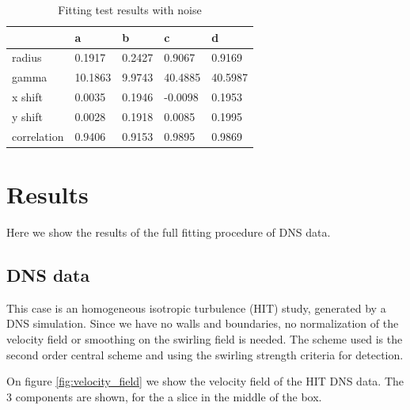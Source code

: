 \documentclass[12pt, a4paper, openany]{memoir}
\begin{document}
\begin{table}[h]
	\centering
	\caption{Fitting test results with noise}
	\vspace{10px}
	\label{tb:fittingtestnoise}
	\begin{tabular}{l|l|l|l|l}
		            & a      & b & c & d \\
		\hline
		radius      & 0.1917   & 0.2427 & 0.9067 & 0.9169  \\
		gamma       & 10.1863 & 9.9743 & 40.4885 & 40.5987 \\
		x shift     & 0.0035  & 0.1946 & -0.0098 & 0.1953 \\
		y shift     & 0.0028  & 0.1918 & 0.0085 & 0.1995 \\ 
		correlation & 0.9406   & 0.9153 & 0.9895 & 0.9869 \\
	\end{tabular}
\end{table}


\chapter{Results}
Here we show the results of the full fitting procedure of DNS data.

\section{DNS data}
This case is an homogeneous isotropic turbulence (HIT) study, generated by a DNS simulation. Since we have no walls and boundaries, no normalization of the velocity field or smoothing on the swirling field is needed. The scheme used is the second order central scheme and using the swirling strength criteria for detection.

On figure \ref{fig:velocity_field} we show the velocity field of the HIT DNS data. The 3 components are shown, for the a slice in the middle of the box.
\end{document}
